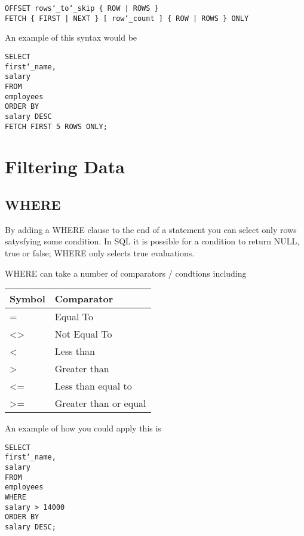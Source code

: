 \documentclass[10pt, english]{article}
\begin{document}
\texttt{OFFSET rows\char`_to\char`_skip \{ ROW | ROWS \} \\
FETCH \{ FIRST | NEXT \} [ row\char`_count ] \{ ROW | ROWS \} ONLY
}

An example of this syntax would be 

\texttt{SELECT\\
\hspace*{10pt} first\char`_name,\\
\hspace*{10pt} salary \\
FROM \\
\hspace*{10pt} employees \\
ORDER BY \\
\hspace*{10pt} salary DESC \\
FETCH FIRST 5 ROWS ONLY;
}

\newpage
\section{Filtering Data}
\subsection{WHERE}
By adding a WHERE clause to the end of a statement you can select only
rows satysfying some condition. In SQL it is possible for a condition to 
return NULL, true or false; WHERE only selects true evaluations. 

WHERE can take a number of comparators / condtions including
\begin{table}[hb]
\centering
\begin{tabular}{ll}
    Symbol & Comparator \\
    \hline
    =  & Equal To \\
    <> & Not Equal To \\
    <  & Less than \\
    >  & Greater than \\
    <= & Less than equal to \\
    >= & Greater than or equal
\end{tabular}
\end{table}

An example of how you could apply this is 

\texttt{SELECT\\
\hspace*{10pt} first\char`_name,\\
\hspace*{10pt} salary \\
FROM \\
\hspace*{10pt} employees \\
WHERE \\
\hspace*{10pt} salary > 14000 \\
ORDER BY \\
\hspace*{10pt} salary DESC;
}
\end{document}
